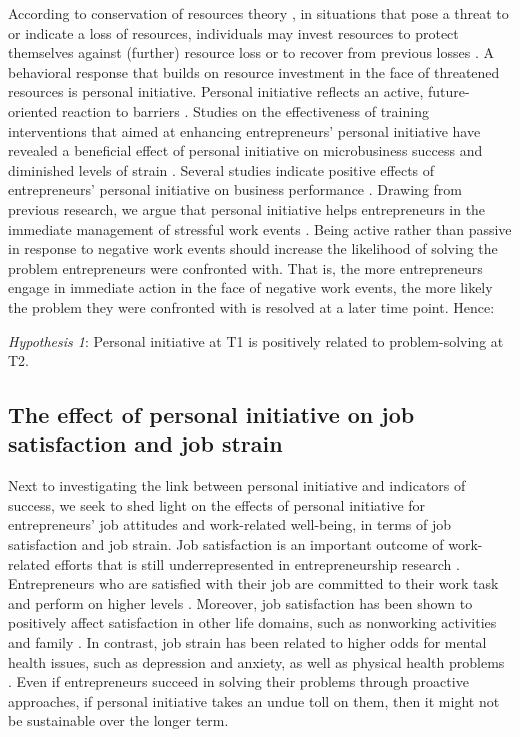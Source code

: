 \documentclass[man, 12pt, a4paper, noextraspace]{apa6}
\begin{document}
According to conservation of resources theory \parencite[COR,][]{Hobfoll.1989}, in situations that pose a threat to or indicate a loss of resources, individuals may invest resources to protect themselves against (further) resource loss or to recover from previous losses \parencite{Hobfoll.2001}. 
A behavioral response that builds on resource investment in the face of threatened resources is personal initiative.
Personal initiative reflects an active, future-oriented reaction to barriers \parencite{Frese1996, Fay2001}.
Studies on the effectiveness of training interventions that aimed at enhancing entrepreneurs' personal initiative have revealed a beneficial effect of personal initiative on microbusiness success \parencite{Frese2000} and diminished levels of strain \parencite{Searle2008}.
Several studies indicate positive effects of entrepreneurs' personal initiative on business performance \parencite[e.g.,][]{Sambasivan2010, Krauss2005}. 
Drawing from previous research, we argue that personal initiative helps entrepreneurs in the immediate management of stressful work events \parencite[e.g.,][]{Frese2000a}.
Being active rather than passive in response to negative work events should increase the likelihood of solving the problem entrepreneurs were confronted with. 
That is, the more entrepreneurs engage in immediate action in the face of negative work events, the more likely the problem they were confronted with is resolved at a later time point.
Hence: \par 

\textit{Hypothesis 1}: Personal initiative at T1 is positively related to problem-solving at T2. \par 

\subsection{The effect of personal initiative on job satisfaction and job strain}

Next to investigating the link between personal initiative and indicators of success, we seek to shed light on the effects of personal initiative for entrepreneurs' job attitudes and work-related well-being, in terms of job satisfaction and job strain. 
Job satisfaction is an important outcome of work-related efforts that is still underrepresented in entrepreneurship research \parencite[see][]{Stephan2018}. 
Entrepreneurs who are satisfied with their job are committed to their work task and perform on higher levels \parencite[e.g.,][]{Judge2001}. 
Moreover, job satisfaction has been shown to positively affect satisfaction in other life domains, such as nonworking activities and family \parencite[e.g.,][]{Heller2002}. 
In contrast, job strain has been related to higher odds for mental health issues, such as depression and anxiety, as well as physical health problems \parencite[e.g.,][]{Strazdins2004}.  
Even if entrepreneurs succeed in solving their problems through proactive approaches, if personal initiative takes an undue toll on them, then it might not be sustainable over the longer term. \par 
\end{document}
